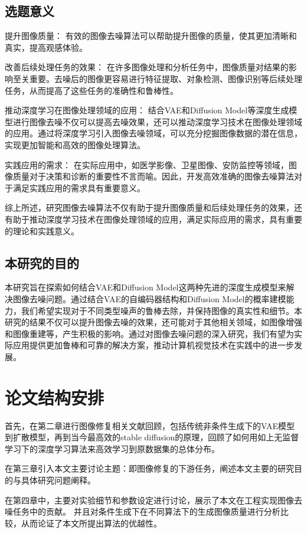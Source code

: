 \subsection*{选题意义}
提升图像质量： 有效的图像去噪算法可以帮助提升图像的质量，使其更加清晰和真实，提高观感体验。\par 
改善后续处理任务的效果： 在许多图像处理和分析任务中，图像质量对结果的影响至关重要。去噪后的图像更容易进行特征提取、对象检测、图像识别等后续处理任务，从而提高了这些任务的准确性和鲁棒性。\par 
推动深度学习在图像处理领域的应用： 结合VAE和Diffusion Model等深度生成模型进行图像去噪不仅可以提高去噪效果，还可以推动深度学习技术在图像处理领域的应用。通过将深度学习引入图像去噪领域，可以充分挖掘图像数据的潜在信息，实现更加智能和高效的图像处理算法。\par 
实践应用的需求： 在实际应用中，如医学影像、卫星图像、安防监控等领域，图像质量对于决策和诊断的重要性不言而喻。因此，开发高效准确的图像去噪算法对于满足实践应用的需求具有重要意义。\par 
综上所述，研究图像去噪算法不仅有助于提升图像质量和后续处理任务的效果，还有助于推动深度学习技术在图像处理领域的应用，满足实际应用的需求，具有重要的理论和实践意义。
\subsection*{本研究的目的}
本研究旨在探索如何结合VAE和Diffusion Model这两种先进的深度生成模型来解决图像去噪问题。通过结合VAE的自编码器结构和Diffusion Model的概率建模能力，我们希望实现对于不同类型噪声的鲁棒去除，并保持图像的真实性和细节。本研究的结果不仅可以提升图像去噪的效果，还可能对于其他相关领域，如图像增强和图像重建等，产生积极的影响。通过对图像去噪问题的深入研究，我们有望为实际应用提供更加鲁棒和可靠的解决方案，推动计算机视觉技术在实践中的进一步发展。
\section{论文结构安排}
首先，在第二章进行图像修复相关文献回顾，包括传统非条件生成下的VAE模型到扩散模型，再到当今最高效的stable diffusion的原理，回顾了如何用如上无监督学习下的深度学习算法来高效学习到原数据集的总体分布。     

在第三章引入本文主要讨论主题：即图像修复的下游任务，阐述本文主要的研究目的与具体研究问题阐释。      

在第四章中，主要对实验细节和参数设定进行讨论，展示了本文在工程实现图像去噪任务中的贡献。 并且对条件生成下在不同算法下的生成图像质量进行分析比较，从而论证了本文所提出算法的优越性。     

